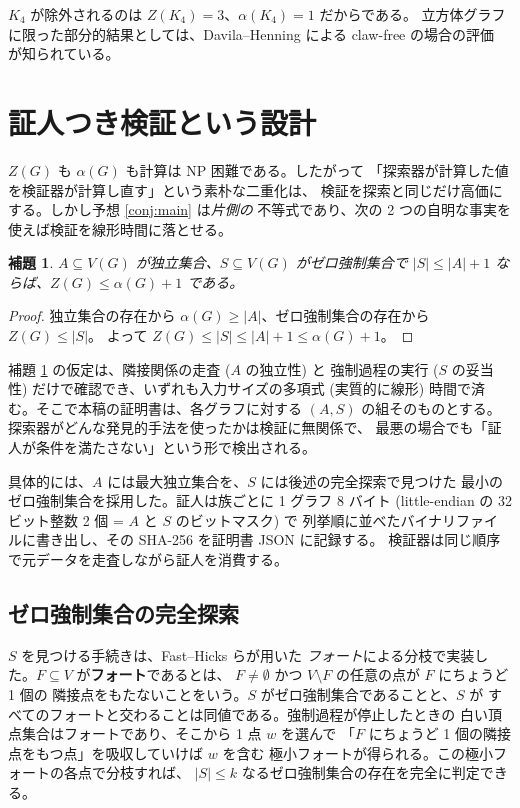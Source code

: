 \documentclass[paper=a4,fontsize=10.5pt,jafontsize=10.5pt]{jlreq}
\theoremstyle{plain}
\newtheorem{lemma}[theorem]{補題}
\theoremstyle{definition}
\begin{document}
$K_4$ が除外されるのは $Z(K_4) = 3$、$\alpha(K_4) = 1$ だからである。
立方体グラフに限った部分的結果としては、Davila--Henning による
claw-free の場合の評価 \cite{davilahenning} が知られている。

\section{証人つき検証という設計}\label{sec:design}

$Z(G)$ も $\alpha(G)$ も計算は NP 困難である。したがって
「探索器が計算した値を検証器が計算し直す」という素朴な二重化は、
検証を探索と同じだけ高価にする。しかし予想 \ref{conj:main} は\emph{片側の}
不等式であり、次の 2 つの自明な事実を使えば検証を線形時間に落とせる。

\begin{lemma}\label{lem:witness}
$A \subseteq V(G)$ が独立集合、$S \subseteq V(G)$ がゼロ強制集合で
$|S| \le |A| + 1$ ならば、$Z(G) \le \alpha(G) + 1$ である。
\end{lemma}

\begin{proof}
独立集合の存在から $\alpha(G) \ge |A|$、ゼロ強制集合の存在から $Z(G) \le |S|$。
よって $Z(G) \le |S| \le |A| + 1 \le \alpha(G) + 1$。
\end{proof}

補題 \ref{lem:witness} の仮定は、隣接関係の走査 ($A$ の独立性) と
強制過程の実行 ($S$ の妥当性) だけで確認でき、いずれも入力サイズの多項式
(実質的に線形) 時間で済む。そこで本稿の証明書は、各グラフに対する
$(A, S)$ の組そのものとする。探索器がどんな発見的手法を使ったかは検証に無関係で、
最悪の場合でも「証人が条件を満たさない」という形で検出される。

具体的には、$A$ には最大独立集合を、$S$ には後述の完全探索で見つけた
最小のゼロ強制集合を採用した。証人は族ごとに 1 グラフ 8 バイト
(little-endian の 32 ビット整数 2 個 = $A$ と $S$ のビットマスク) で
列挙順に並べたバイナリファイルに書き出し、その SHA-256 を証明書 JSON に記録する。
検証器は同じ順序で元データを走査しながら証人を消費する。

\subsection{ゼロ強制集合の完全探索}

$S$ を見つける手続きは、Fast--Hicks \cite{fasthicks} らが用いた
\emph{フォート}による分枝で実装した。$F \subseteq V$ が\textbf{フォート}であるとは、
$F \ne \emptyset$ かつ $V \setminus F$ の任意の点が $F$ にちょうど 1 個の
隣接点をもたないことをいう。$S$ がゼロ強制集合であることと、$S$ が
すべてのフォートと交わることは同値である。強制過程が停止したときの
白い頂点集合はフォートであり、そこから 1 点 $w$ を選んで
「$F$ にちょうど 1 個の隣接点をもつ点」を吸収していけば $w$ を含む
極小フォートが得られる。この極小フォートの各点で分枝すれば、
$|S| \le k$ なるゼロ強制集合の存在を完全に判定できる。
\end{document}
